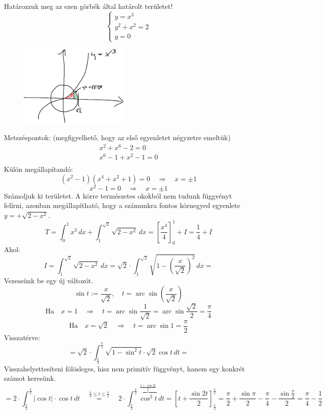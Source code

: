 \documentclass[a4paper,11.5pt]{article}
\DeclareMathOperator{\arc}{arc}
\begin{document}
	\begin{example}Határozzuk meg az ezen görbék által határolt területet!
		\[\begin{cases}
			y=x^3\\
			y^2+x^2=2\\
			y=0
		\end{cases}\]
		\begin{figure}[H]
			\centering
			\includegraphics[height=4cm]{kepek/09.png}
			\caption{}
		\end{figure}
		Metszéspontok: (megfigyelhető, hogy az első egyenletet négyzetre emeltük)
		\begin{align*}
			x^2+x^6-2=0\\
			x^6-1+x^2-1=0\\
		\end{align*}
		Külön megállapítandó:
		\[(x^2-1)(x^4+x^2+1)=0\quad \Rightarrow\quad x=\pm1 \]
		\[ x^2-1=0\quad \Rightarrow\quad x=\pm1 \]
		Számoljuk ki  területet. A körre természetes okokból nem tudunk függvényt felírni, azonban megállapítható, hogy a számunkra fontos körnegyed egyenlete $y=+\sqrt{2-x^2}$.
		\[ T=\int_0^1x^3\,dx+\int_1^{\sqrt{2}}\sqrt{2-x^2}\,dx=\left[\frac{x^4}{4}\right]_0^1+I=\frac{1}{4}+I \]
		Ahol:
		\[ I=\int_1^{\sqrt{2}}\sqrt{2-x^2}\,dx=\sqrt{2}\cdot\int_1^{\sqrt{2}}\sqrt{1-\left(\frac{x}{\sqrt{2}}\right)^2}\,dx= \]
		Vezessünk be egy új változót.
		\[ \sin t:=\frac{x}{\sqrt{2}},\quad t=\arc\sin\left(\frac{x}{\sqrt{2}}\right) \]
		\[\text{Ha}\quad x=1\quad \Rightarrow\quad t=\arc\sin\frac{1}{\sqrt{2}}=\arc\sin\frac{\sqrt{2}}{2}=\frac{\pi}{4} \]
		\[\text{Ha}\quad x=\sqrt{2}\quad \Rightarrow\quad t=\arc\sin1=\frac{\pi}{2} \]
		Visszatérve:
		\[ =\sqrt{2}\cdot\int_{\frac{\pi}{4}}^{\frac{\pi}{2}}\sqrt{1-\sin^2t}\cdot\sqrt{2}\cos t\,dt= \]
		Visszahelyettesíteni fölösleges, hisz nem primitív függvényt, hanem egy konkrét számot keresünk.
		\[ =2\cdot\int_{\frac{\pi}{4}}^{\frac{\pi}{2}}|\cos t|\cdot\cos t\,dt\quad \overset{\frac{\pi}{4}\leq t\leq \frac{\pi}{2}}{=}\quad2\cdot\int_{\frac{\pi}{4}}^{\frac{\pi}{2}}\overbrace{\cos^2t}^{\frac{1+\cos2t}{2}}\,dt=\left[t+\frac{\sin2t}{2}\right]_{\frac{\pi}{4}}^{\frac{\pi}{2}}=\frac{\pi}{2}+\frac{\sin\pi}{2}-\frac{\pi}{4}-\frac{\sin\frac{\pi}{2}}{2}=\frac{\pi}{4}-\frac{1}{2}  \]
	\end{example}
\end{document}
